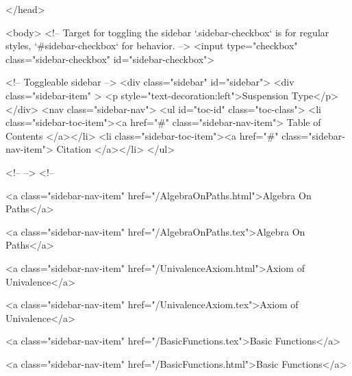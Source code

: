   
</head>




  <body>
    <!-- Target for toggling the sidebar `.sidebar-checkbox` is for regular
     styles, `#sidebar-checkbox` for behavior. -->
<input type="checkbox" class="sidebar-checkbox" id="sidebar-checkbox">

<!-- Toggleable sidebar -->
<div class="sidebar" id="sidebar">
  <div class="sidebar-item" >
    <p style="text-decoration:left">Suspension Type</p>
  </div>
  <nav class="sidebar-nav">
    <ul id="toc-id" class="toc-class">
  <li class="sidebar-toc-item"><a href="#" class="sidebar-nav-item"> Table of Contents </a></li>
  <li class="sidebar-toc-item"><a href="#" class="sidebar-nav-item"> Citation </a></li>
</ul>


    <!--  -->
    <!-- 
      
    
      
    
      
    
      
        
      
    
      
        
          <a class="sidebar-nav-item" href="/AlgebraOnPaths.html">Algebra On Paths</a>
        
      
    
      
        
          <a class="sidebar-nav-item" href="/AlgebraOnPaths.tex">Algebra On Paths</a>
        
      
    
      
        
          <a class="sidebar-nav-item" href="/UnivalenceAxiom.html">Axiom of Univalence</a>
        
      
    
      
        
          <a class="sidebar-nav-item" href="/UnivalenceAxiom.tex">Axiom of Univalence</a>
        
      
    
      
        
          <a class="sidebar-nav-item" href="/BasicFunctions.tex">Basic Functions</a>
        
      
    
      
        
          <a class="sidebar-nav-item" href="/BasicFunctions.html">Basic Functions</a>
        
      
    
      
        
